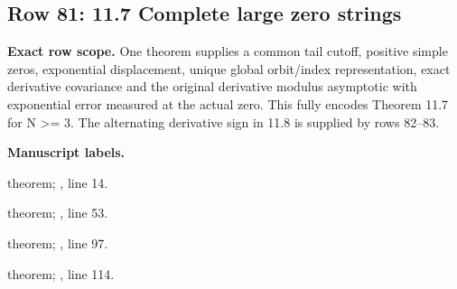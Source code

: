 \subsection{Row 81: 11.7 Complete large zero strings}
\label{row:81}
\textbf{Exact row scope.} One theorem supplies a common tail cutoff, positive simple zeros, exponential displacement, unique global orbit/index representation, exact derivative covariance and the original derivative modulus asymptotic with exponential error measured at the actual zero. This fully encodes Theorem 11.7 for N >= 3. The alternating derivative sign in 11.8 is supplied by rows 82--83.\par\smallskip
\textbf{Manuscript labels.} \par\smallskip
{\small{}\par}
{\footnotesize\color{muted}theorem; , line 14.\par}\smallskip
{\small{}\par}
{\footnotesize\color{muted}theorem; , line 53.\par}\smallskip
{\small{}\par}
{\footnotesize\color{muted}theorem; , line 97.\par}\smallskip
{\small{}\par}
{\footnotesize\color{muted}theorem; , line 114.\par}\smallskip
{}
